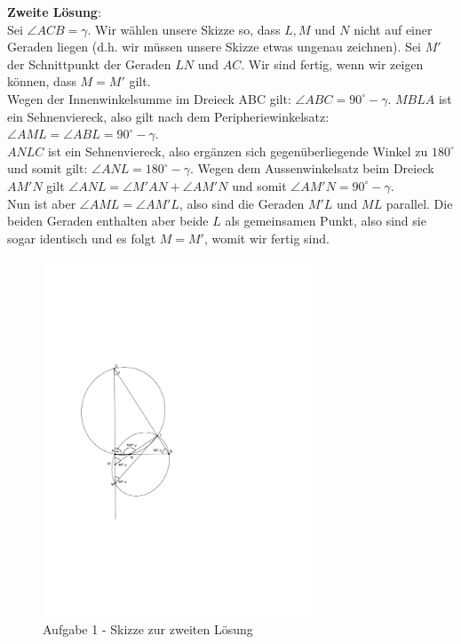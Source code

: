 \documentclass[12pt,a4paper]{article}
\theoremstyle{plain}
\theoremstyle{definition}
\theoremstyle{remark}
\begin{document}
\begin{enumerate}
\textbf{Zweite Lösung}:\\
Sei $\angle ACB=\gamma$. Wir wählen unsere Skizze so, dass $L, M$ und $N$ nicht auf einer Geraden liegen (d.h. wir müssen unsere Skizze etwas ungenau zeichnen). Sei $M'$ der Schnittpunkt der Geraden $LN$ und $AC$. Wir sind fertig, wenn wir zeigen können, dass $M=M'$ gilt.\\
Wegen der Innenwinkelsumme im Dreieck ABC gilt: $\angle ABC=90^\circ-\gamma$. $MBLA$ ist ein Sehnenviereck, also gilt nach dem Peripheriewinkelsatz: $\angle AML=\angle ABL=90^\circ-\gamma$.\\
$ANLC$ ist ein Sehnenviereck, also ergänzen sich gegenüberliegende Winkel zu $180^\circ$ und somit gilt: $\angle ANL=180^\circ-\gamma$. Wegen dem Aussenwinkelsatz beim Dreieck $AM'N$ gilt $\angle ANL=\angle M'AN+\angle AM'N$ und somit $\angle AM'N=90^\circ-\gamma$.\\
Nun ist aber $\angle AML=\angle AM'L$, also sind die Geraden $M'L$ und $ML$ parallel. Die beiden Geraden enthalten aber beide $L$ als gemeinsamen Punkt, also sind sie sogar identisch und es folgt $M=M'$, womit wir fertig sind.\\

\begin{figure}[h]
\begin{center}
\includegraphics[width=8cm]{aufgabe1b.pdf}
\caption{Aufgabe 1 - Skizze zur zweiten Lösung}
\end{center}
\end{figure}


\end{enumerate}
\end{document}
